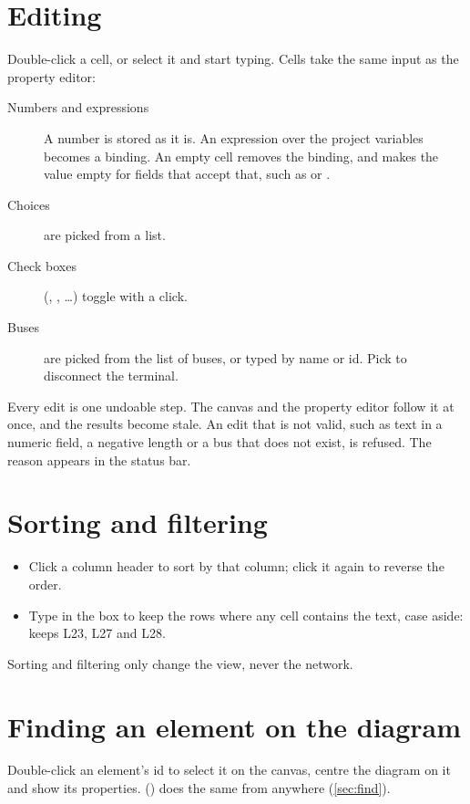 \section{Editing}

Double-click a cell, or select it and start typing. Cells take the same input as the
property editor:

\begin{description}
  \item[Numbers and expressions] A number is stored as it is. An expression over the
    project variables becomes a binding. An empty cell removes the binding, and makes
    the value empty for fields that accept that, such as  or .
  \item[Choices] are picked from a list.
  \item[Check boxes] (, , \dots) toggle with a click.
  \item[Buses] are picked from the list of buses, or typed by name or id. Pick
     to disconnect the terminal.
\end{description}

Every edit is one undoable step. The canvas and the property editor follow it at once,
and the results become stale. An edit that is not valid, such as text in a numeric field,
a negative length or a bus that does not exist, is refused. The reason appears in the
status bar.

\section{Sorting and filtering}

\begin{itemize}
  \item Click a column header to sort by that column; click it again to reverse the order.
  \item Type in the  box to keep the rows where any cell contains the text,
    case aside:  keeps L23, L27 and L28.
\end{itemize}

Sorting and filtering only change the view, never the network.

\section{Finding an element on the diagram}

Double-click an element's id to select it on the canvas, centre the diagram on it and
show its properties.  () does the same from
anywhere (\cref{sec:find}).
